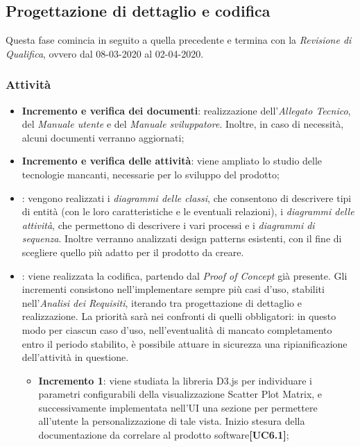\subsection{Progettazione di dettaglio e codifica}
Questa fase comincia in seguito a quella precedente e termina con la \textit{Revisione di Qualifica}, ovvero dal 08-03-2020 al 02-04-2020.

\subsubsection{Attività}
\begin{itemize}
	\item \textbf{Incremento e verifica dei documenti}: realizzazione dell'\textit{Allegato Tecnico}, del \textit{Manuale utente} e del \textit{Manuale sviluppatore}. Inoltre, in caso di necessità, alcuni documenti verranno aggiornati;
	\item \textbf{Incremento e verifica delle attività}: viene ampliato lo studio delle tecnologie mancanti, necessarie per lo sviluppo del prodotto; 
	\item \textbf{}: vengono realizzati i \textit{diagrammi delle classi}, che consentono di descrivere tipi di entità (con le loro caratteristiche e le eventuali relazioni), i \textit{diagrammi delle attività}, che permettono di descrivere i vari processi e i \textit{diagrammi di sequenza}. Inoltre verranno analizzati design patterns esistenti, con il fine di scegliere quello più adatto per il prodotto da creare.
	\item \textbf{}: viene realizzata la codifica, partendo dal \textit{Proof of Concept} già presente. Gli incrementi consistono nell'implementare sempre più casi d'uso, stabiliti nell'\textit{Analisi dei Requisiti}, iterando tra progettazione di dettaglio e realizzazione. La priorità sarà nei confronti di quelli obbligatori: in questo modo per ciascun caso d'uso, nell'eventualità di mancato completamento entro il periodo stabilito, è possibile attuare in sicurezza una ripianificazione dell'attività in questione.
	\begin{itemize}
	\item \textbf{Incremento 1}: viene studiata la libreria D3.js per individuare i parametri configurabili della visualizzazione Scatter Plot Matrix, e successivamente implementata nell'UI una sezione per permettere all'utente la personalizzazione di tale vista. Inizio stesura della documentazione da correlare al prodotto software\textbf{[UC6.1]};
	

\end{itemize}
\end{itemize}
